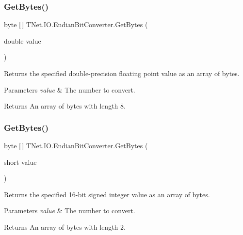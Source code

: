 \subsubsection{\texorpdfstring{Get\+Bytes()}{GetBytes()}\hspace{0.1cm}{\footnotesize\ttfamily [4/11]}}
{\footnotesize\ttfamily byte \mbox{[}$\,$\mbox{]} T\+Net.\+I\+O.\+Endian\+Bit\+Converter.\+Get\+Bytes (\begin{DoxyParamCaption}\item[{double}]{value }\end{DoxyParamCaption})}



Returns the specified double-\/precision floating point value as an array of bytes. 


\begin{DoxyParams}{Parameters}
{\em value} & The number to convert.\\
\hline
\end{DoxyParams}
\begin{DoxyReturn}{Returns}
An array of bytes with length 8.
\end{DoxyReturn}
\mbox{\label{class_t_net_1_1_i_o_1_1_endian_bit_converter_ab0553ed30b167a3cd3df5a1422c31b98}} 
\subsubsection{\texorpdfstring{Get\+Bytes()}{GetBytes()}\hspace{0.1cm}{\footnotesize\ttfamily [5/11]}}
{\footnotesize\ttfamily byte \mbox{[}$\,$\mbox{]} T\+Net.\+I\+O.\+Endian\+Bit\+Converter.\+Get\+Bytes (\begin{DoxyParamCaption}\item[{short}]{value }\end{DoxyParamCaption})}



Returns the specified 16-\/bit signed integer value as an array of bytes. 


\begin{DoxyParams}{Parameters}
{\em value} & The number to convert.\\
\hline
\end{DoxyParams}
\begin{DoxyReturn}{Returns}
An array of bytes with length 2.
\end{DoxyReturn}
\mbox{\label{class_t_net_1_1_i_o_1_1_endian_bit_converter_a116e1d710499764287b46c7bd76ce00e}} 
